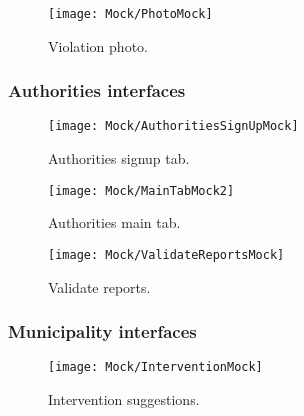 \begin{figure}[H]
	\centering
	\begin{minipage}[b]{0.99\linewidth}
		\texttt{[image: Mock/PhotoMock]}
		\caption{Violation photo.}
	\end{minipage}
\end{figure}

\subsubsection{Authorities interfaces}

\begin{figure}[H]
	\centering
	\begin{minipage}[b]{0.38\linewidth}
	    \texttt{[image: Mock/AuthoritiesSignUpMock]}
	    \caption{\small Authorities signup tab.}
	\end{minipage}
	\begin{minipage}[b]{0.38\linewidth}
		\texttt{[image: Mock/MainTabMock2]}
		\caption{\small Authorities main tab.}
		\label{mainTab2}
	\end{minipage}
	\begin{minipage}[b]{0.38\linewidth}
		\texttt{[image: Mock/ValidateReportsMock]}
		\caption{\small Validate reports.}
	\end{minipage}
\end{figure}

\subsubsection{Municipality interfaces}

\begin{figure}[H]
	\centering
	\begin{minipage}[b]{0.4\linewidth}
	    \texttt{[image: Mock/InterventionMock]}
	    \caption{Intervention suggestions.}
	\end{minipage}
\end{figure}




